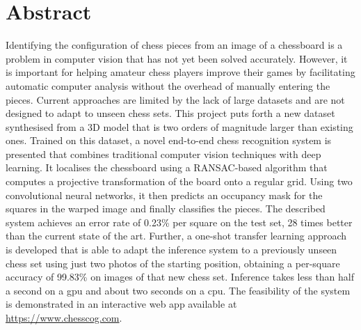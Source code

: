 \documentclass[../report.tex]{subfiles}
\begin{document}
\chapter*{Abstract}

Identifying the configuration of chess pieces from an image of a chessboard is a problem in computer vision that has not yet been solved accurately.
However, it is important for helping amateur chess players improve their games by facilitating automatic computer analysis without the overhead of manually entering the pieces.
Current approaches are limited by the lack of large datasets and are not designed to adapt to unseen chess sets.
This project puts forth a new dataset synthesised from a 3D model that is two orders of magnitude larger than existing ones.
Trained on this dataset, a novel end-to-end chess recognition system is presented that combines traditional computer vision techniques with deep learning.
It localises the chessboard using a RANSAC-based algorithm that computes a projective transformation of the board onto a regular grid.
Using two convolutional neural networks, it then predicts an occupancy mask for the squares in the warped image and finally classifies the pieces.
The described system achieves an error rate of 0.23\% per square on the test set, 28 times better than the current state of the art.
Further, a one-shot transfer learning approach is developed that is able to adapt the inference system to a previously unseen chess set using just two photos of the starting position, obtaining a per-square accuracy of 99.83\% on images of that new chess set.
Inference takes less than half a second on a \acs{gpu} and about two seconds on a \acs{cpu}.
The feasibility of the system is demonstrated in an interactive web app available at \url{https://www.chesscog.com}.
\end{document}
